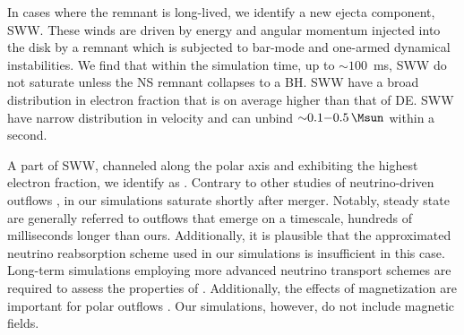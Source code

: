In cases where the \pmerg{} remnant is long-lived, we identify a new ejecta component, 
\ac{SWW}. These winds are driven by energy and angular momentum injected into the 
disk by a remnant which is subjected to bar-mode and one-armed dynamical instabilities.
We find that within the simulation time, up to ${\sim}100$~ms, \ac{SWW} do not 
saturate unless the \ac{NS} remnant collapses to a \ac{BH}.
\ac{SWW} have a broad distribution in electron fraction that is on average higher
than that of \ac{DE}. 
\ac{SWW} have narrow distribution in velocity and can unbind
${\sim}0.1{-}0.5\, \Msun$ within a second.

A part of \ac{SWW}, channeled along the polar axis and exhibiting the highest
electron fraction, we identify as \nwind{}. Contrary to other studies of 
neutrino-driven outflows \citep[\eg][]{Dessart:2008zd,Perego:2014fma,Fujibayashi:2020dvr},
\nwind{} in our simulations saturate shortly after merger.
%
Notably, steady state \nwind{} are generally referred to outflows 
that emerge on a timescale,  hundreds of milliseconds longer than ours. 
Additionally, it is plausible that the approximated neutrino reabsorption 
scheme used in our simulations is insufficient in this case. 
Long-term simulations employing more advanced 
neutrino transport schemes are required to assess the properties of \nwind.
%
Additionally, the effects of magnetization are important for polar outflows 
\citep{Siegel:2017nub,Metzger:2018uni,Fernandez:2018kax,Miller:2019dpt,Mosta:2020hlh}.
Our simulations, however, do not include magnetic fields. 

